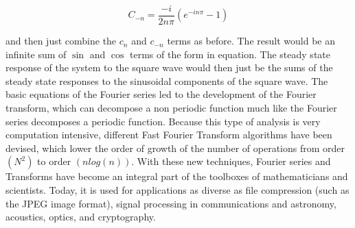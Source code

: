 \documentclass[a4paper,12pt]{article}
\begin{document}
        $$C_{-n} = \frac{-i}{2n\pi}\left(e^{-in\pi} - 1\right)$$

        and then just combine the $c_{n}$ and $c_{-n}$ terms as before. The result would be an
        infinite sum of $\sin$ and $\cos$ terms of the form in equation. The steady state
        response of the system to the square wave would then just be the sums of the
        steady state responses to the sinusoidal components of the square wave.
        The basic equations of the Fourier series led to the development of the Fourier
        transform, which can decompose a non periodic function much like the Fourier
        series decomposes a periodic function. Because this type of analysis is very
        computation intensive, different Fast Fourier Transform algorithms have been
        devised, which lower the order of growth of the number of operations from
        order $(N^2)$ to order $(n log(n))$.
        With these new techniques, Fourier series and Transforms have become an
        integral part of the toolboxes of mathematicians and scientists. Today, it is
        used for applications as diverse as file compression (such as the JPEG image
        format), signal processing in communications and astronomy, acoustics, optics,
        and cryptography.





    




    
                    
                    
              




        
        

        






        




        



        

        

        
    

    
\end{document}
